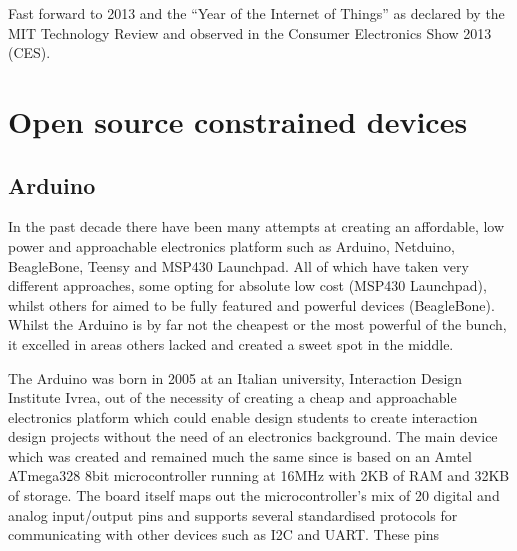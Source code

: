 \documentclass{l4proj}
\begin{document}
Fast forward to 2013 and the ``Year of the Internet of Things'' as declared by the MIT Technology Review\cite{2013IoT} and observed in the Consumer Electronics Show 2013 (CES).




\newpage
\section{Open source constrained devices} %
\label{sec:open_source_constrained_devices}

\subsection{Arduino} %
\label{sub:arduino}
In the past decade there have been many attempts at creating an affordable, low power and approachable electronics platform such as Arduino, Netduino, BeagleBone, Teensy and MSP430 Launchpad. All of which have taken very different approaches, some opting for absolute low cost (MSP430 Launchpad), whilst others for aimed to be fully featured and powerful devices (BeagleBone). Whilst the Arduino is by far not the cheapest or the most powerful of the bunch, it excelled in areas others lacked and created a sweet spot in the middle.

The Arduino was born in 2005 at an Italian university, Interaction Design Institute Ivrea, out of the necessity of creating a cheap and approachable electronics platform which could enable design students to create interaction design projects without the need of an electronics background.
The main device which was created and remained much the same since is based on an Amtel ATmega328 8bit microcontroller running at 16MHz with 2KB of RAM and 32KB of storage. The board itself maps out the microcontroller's mix of 20 digital and analog input/output pins and supports several standardised protocols for communicating with other devices such as I2C and UART. These pins  
\end{document}
